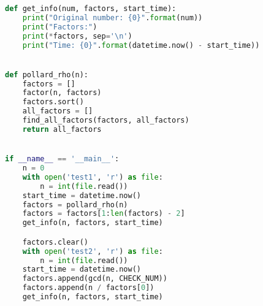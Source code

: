 \documentclass[12pt]{article}
\begin{document}
\begin{lstlisting}[language=Python]
def get_info(num, factors, start_time):
    print("Original number: {0}".format(num))
    print("Factors:")
    print(*factors, sep='\n')
    print("Time: {0}".format(datetime.now() - start_time))


def pollard_rho(n):
    factors = []
    factor(n, factors)
    factors.sort()
    all_factors = []
    find_all_factors(factors, all_factors)
    return all_factors


if __name__ == '__main__':
    n = 0
    with open('test1', 'r') as file:
        n = int(file.read())
    start_time = datetime.now()
    factors = pollard_rho(n)
    factors = factors[1:len(factors) - 2]
    get_info(n, factors, start_time)

    factors.clear()
    with open('test2', 'r') as file:
        n = int(file.read())
    start_time = datetime.now()
    factors.append(gcd(n, CHECK_NUM))
    factors.append(n / factors[0])
    get_info(n, factors, start_time)

\end{lstlisting}
\end{document}

